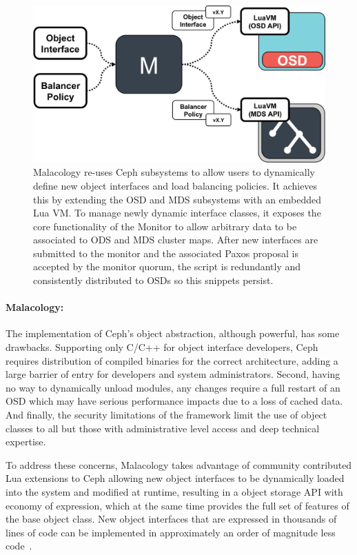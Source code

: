\documentclass[preprint]{sigplanconf-eurosys}
\begin{document}
\begin{figure}[htbp]
\centering
\includegraphics{figures/implementation.png}
\caption{Malacology re-uses Ceph subsystems to allow users to dynamically define 
new object interfaces and load balancing policies. It achieves this by extending 
the OSD and MDS subsystems with an embedded Lua VM. To manage newly dynamic 
interface classes, it exposes the core functionality of the Monitor to allow 
arbitrary data to be associated to ODS and MDS cluster maps. After new 
interfaces are submitted to the monitor and the associated Paxos proposal is 
accepted by the monitor quorum, the script is redundantly and consistently 
distributed to OSDs so this snippets persist.
\label{fig:implementation}}
\end{figure}

\paragraph*{Malacology:} The implementation of Ceph's object abstraction,
although powerful, has some drawbacks. Supporting only C/C++ for object
interface developers, Ceph requires distribution of compiled binaries for the
correct architecture, adding a large barrier of entry for developers and
system administrators. Second, having no way to dynamically unload modules,
any changes require a full restart of an OSD which may have serious
performance impacts due to a loss of cached data. And
finally, the security limitations of the framework limit the use of object
classes to all but those with administrative level access and deep technical
expertise.

To address these concerns, Malacology takes advantage of community contributed
Lua extensions to Ceph allowing new object interfaces to be dynamically loaded
into the system and modified at runtime, resulting in a object storage API
with economy of expression, which at the same time provides the full set of
features of the base object class. New object interfaces that are
expressed in thousands of lines of code can be implemented in approximately an
order of magnitude less code~\cite{geambasu_comet_2010}.
\end{document}
